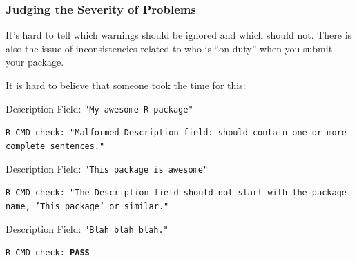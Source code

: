 \documentclass[12 pt]{beamer}\usepackage[]{graphicx}\usepackage[]{color}
\begin{document}
\begin{frame}[fragile]
\frametitle{Judging the Severity of Problems}

It's hard to tell which warnings should be ignored and which should not. There is also the issue of inconsistencies related to who is ``on duty'' when you submit your package.

\vspace{.1in}

It is hard to believe that someone took the time for this:

\vspace{.15in}
\begin{footnotesize}
Description Field: {\tt "My awesome R package"}

{\tt R CMD check: "{\color{red}Malformed Description field: should contain one or more complete sentences.}"}

\vspace{.15in}

Description Field: {\tt "This package is awesome"}

{\tt R CMD check: "{\color{red}The Description field should not start with the package name, 'This package' or similar.}"}

\vspace{.15in}

Description Field: {\tt "Blah blah blah."}

{\tt R CMD check: {\color{green}\bf PASS}}
\end{footnotesize}

\end{frame}
\end{document}
